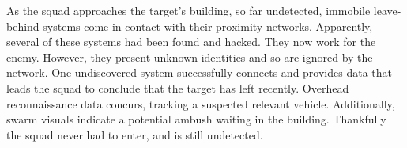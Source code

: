 As the squad approaches the target's building, so far undetected, immobile leave-behind systems come in contact with their proximity networks.
Apparently, several of these systems had been found and hacked.
They now work for the enemy.
However, they present unknown identities and so are ignored by the network.
One undiscovered system successfully connects and provides data that leads the squad to conclude that the target has left recently.
Overhead reconnaissance data concurs, tracking a suspected relevant vehicle.
Additionally, swarm visuals indicate a potential ambush waiting in the building.
Thankfully the squad never had to enter, and is still undetected.
